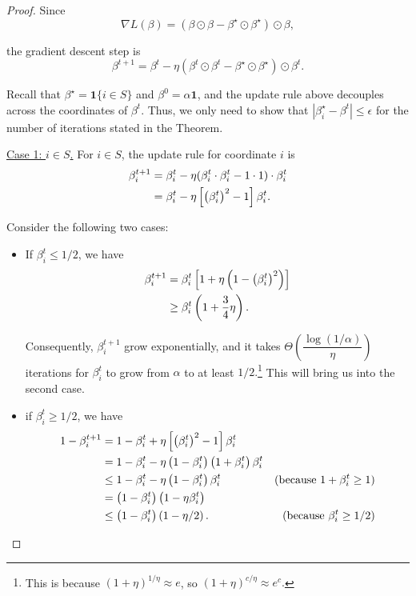 \begin{proof}

Since
\begin{equation}
\nabla L(\beta) = (\beta\odot \beta-\beta^\star\odot\beta^\star)\odot\beta,
\end{equation}

the gradient descent step is
\begin{equation}
\beta^{t+1} = \beta^t - \eta (\beta^t \odot \beta^t -\beta^\star \odot \beta^\star)\odot\beta^t.
\end{equation}

Recall that $\beta^\star=\mathbf{1} \{i \in S \}$ and $\beta^0=\alpha \mathbf{1}$, and the update rule above decouples across the coordinates of $\beta^t$. Thus, we only need to show that $| \beta_i^\star - \beta^t | \leq \epsilon$ for the number of iterations stated in the Theorem.

\underline{Case 1: $i\in S$.} For $i \in S$, the update rule for coordinate $i$ is
\begin{align}
\beta_i^{t+1} &= \beta_i^t - \eta (\beta_i^t \cdot \beta_i^t - 1 \cdot 1) \cdot\beta_i^t \\ 
&= \beta_i^t - \eta \left[ \left(\beta_i^t\right)^2 - 1 \right] \beta_i^t.
\end{align}

Consider the following two cases:

\begin{itemize}
\item If $\beta_i^t\le 1/2$, we have
\begin{align}
\beta_i^{t+1}&=\beta_i^{t} \left[ 1+\eta \left(1- \left(\beta_i^t \right)^2 \right) \right] \\
&\ge \beta_i^t \left( 1+\frac{3}{4}\eta \right).
\end{align}

Consequently, $\beta_i^{t+1}$ grow exponentially, and it takes $\Theta\left(\dfrac{\log (1/\alpha)}{\eta}\right)$ iterations for $\beta_i^t$ to grow from $\alpha$ to at least $1/2.$\footnote{This is because $(1+\eta)^{1/\eta}\approx e$, so $(1+\eta)^{c/\eta}\approx e^{c}.$} This will bring us into the second case.
    
\item if $\beta_i^t\ge 1/2$, we have
\begin{align}
1-\beta_i^{t+1}&=1-\beta_i^t+\eta \left[ \left(\beta_i^t \right)^2-1 \right] \beta_i^t\\
&=1-\beta_i^{t}-\eta \left( 1-\beta_i^t \right) \left(1+\beta_i^t \right)\beta_i^t\\
&\le 1-\beta_i^t-\eta \left( 1-\beta_i^t \right)\beta_i^t &\text{(because $1+\beta_i^t\ge 1$)} \\
&= \left(1-\beta_i^t \right) \left( 1-\eta \beta_i^t \right) \\
&\le \left( 1-\beta_i^t \right) \left(1-\eta/2 \right). &\text{(because $\beta_i^t\ge 1/2$)}
\end{align}


\end{itemize}
\end{proof}
